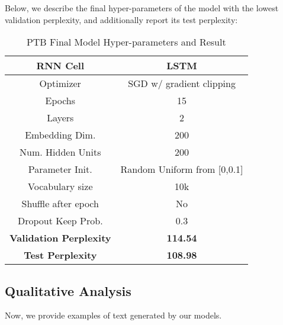 \documentclass[a4paper]{article}
\begin{document}
Below, we describe the final hyper-parameters of the model with the lowest validation perplexity, and additionally report its test perplexity:
\begin{table}[h!]
\centering
\begin{tabular}{|c | c|} 
 \hline
RNN Cell & LSTM\\ \hline
Optimizer & SGD w/ gradient clipping \\ \hline
Epochs & 15\\ \hline
Layers & 2\\ \hline
Embedding Dim. & 200\\ \hline
Num. Hidden Units & 200\\ \hline
Parameter Init. & Random Uniform from [0,0.1]\\ \hline
Vocabulary size & 10k\\ \hline
Shuffle after epoch & No \\ \hline
Dropout Keep Prob. & 0.3 \\ \hline
\textbf{Validation Perplexity} &\textbf{114.54} \\ \hline
\textbf{Test Perplexity} &\textbf{108.98} \\ \hline
\end{tabular}
\caption{PTB Final Model Hyper-parameters and Result}
\label{table:1}
\end{table}

\subsection{Qualitative Analysis}

Now, we provide examples of text generated by our models. 
\end{document}

